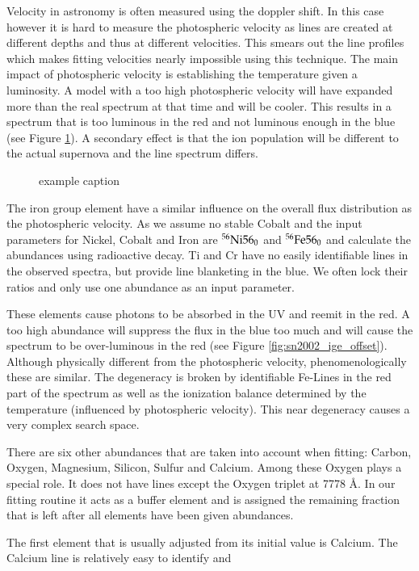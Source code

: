 Velocity in astronomy is often measured using the doppler shift. In this case however it is hard to measure the photospheric velocity as lines are created at different depths and thus at different velocities. This smears out the line profiles which makes fitting velocities nearly impossible using this technique. 
The main impact of photospheric velocity is establishing the temperature given a luminosity. A model with a too high photospheric velocity will have expanded more than the real spectrum at that time and will be cooler. This results in a spectrum that is too luminous in the red and not luminous enough in the blue (see Figure \ref{fig:sn2002bo_vph_offset}). 
A secondary effect is that the ion population will be different to the actual supernova and the line spectrum differs.
\begin{figure}[htbp] %
   \centering
   \caption{example caption}
   \label{fig:sn2002bo_vph_offset}
\end{figure}

The iron group element have a similar influence on the overall flux distribution as the photospheric velocity. 
As we assume no stable Cobalt and the input parameters for Nickel, Cobalt and Iron are $^{56}\textrm{Ni}{56}_0$ and $^{56}\textrm{Fe}{56}_0$ and calculate the abundances using radioactive decay. Ti and Cr have no easily identifiable lines in the observed spectra, but provide line blanketing in the blue. We often lock their ratios and only use one abundance as an input parameter. 

These elements cause photons to be absorbed in the UV and reemit in the red. A too high abundance will suppress the flux in the blue too much and will cause the spectrum to be over-luminous in the red (see Figure \ref{fig:sn2002_ige_offset}). Although physically different from the photospheric velocity, phenomenologically these are similar. 
The degeneracy is broken by identifiable Fe-Lines in the red part of the spectrum as well as the ionization balance determined by the temperature (influenced by photospheric velocity). 
This near degeneracy causes a very complex search space. 

There are six other abundances that are taken into account when fitting: Carbon, Oxygen, Magnesium, Silicon, Sulfur and Calcium. Among these Oxygen plays a special role. It does not have lines except the Oxygen triplet at 7778 \AA. In our fitting routine it acts as a buffer element and is assigned the remaining fraction that is left after all elements have been given abundances. 

The first element that is usually adjusted from its initial value is Calcium. The Calcium line is relatively easy to identify and 












